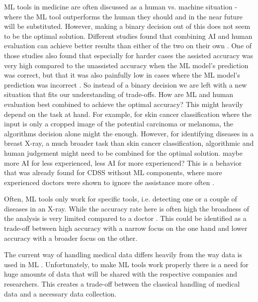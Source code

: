 ML tools in medicine are often discussed as a human vs. machine situation - where the ML tool outperforms the human they should and in the near future will be substituted. However, making a binary decision out of this does not seem to be the optimal solution. Different studies found that combining AI and human evaluation can achieve better results than either of the two on their own \cite{rajpurkar2022ai, kiani2020impact, topol2019high, steiner2018impact}. One of those studies also found that especially for harder cases the assisted accuracy was very high compared to the unassisted accuracy when the ML model's prediction was correct, but that it was also painfully low in cases where the ML model's prediction was incorrect \cite{kiani2020impact}. So instead of a binary decision we are left with a new situation that fits our understanding of trade-offs. How are ML and human evaluation best combined to achieve the optimal accuracy? This might heavily depend on the task at hand. For example, for skin cancer classification where the input is only a cropped image of the potential carcinoma or melanoma, the algorithms decision alone might the enough. However, for identifying diseases in a breast X-ray, a much broader task than skin cancer classification, algorithmic and human judgement might need to be combined for the optimal solution.
 maybe more AI for less experienced, less AI for more experienced? This is a behavior that was already found for CDSS without ML components, where more experienced doctors were shown to ignore the assistance more often \cite{sutton2020overview}.


Often, ML tools only work for specific tools, i.e. detecting one or a couple of diseases in an X-ray. While the accuracy rate here is often high the broadness of the analysis is very limited compared to a doctor \cite{topol2019high}. This could be identified as a trade-off between high accuracy with a narrow focus on the one hand and lower accuracy with a broader focus on the other.


The current way of handling medical data differs heavily from the way data is used in ML \cite{he2019practical}. Unfortunately, to make ML tools work properly there is a need for huge amounts of data that will be shared with the respective companies and researchers. This creates a trade-off between the classical handling of medical data and a necessary data collection.


